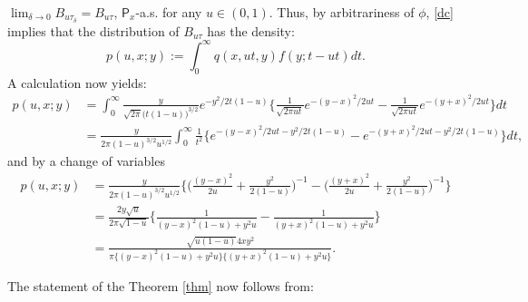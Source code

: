 \documentclass[reqno,10pt]{amsart}
\theoremstyle{definition}
\theoremstyle{remark}
\numberwithin{equation}{section}
\begin{document}
$\lim_{\delta\to 0}B_{u\tau_\delta}=B_{u\tau}$, ${\mathsf{P}}_x$-a.s. for any $u\in(0,1)$. Thus, by arbitrariness of $\phi$,
\eqref{dc}  implies that the distribution of $B_{u\tau}$ has the density:
$$
p(u,x;y):=\int_0^\infty q(x,u t,y) f(y;t-ut)dt.
$$
A calculation now yields:
\begin{align*}
p(u,x;y)&=
\int_0^\infty
\frac{y}{\sqrt{2\pi} \big(t(1-u)\big)^{3/2}}
e^{-y^2/2t(1-u)}
\bigg\{\frac{1}{\sqrt{2\pi ut}}e^{-(y-x)^2/2ut}-\frac{1}{\sqrt{2\pi ut}}e^{-(y+x)^2/2ut}\bigg\}dt
\\
&=\frac{y}{2\pi (1-u)^{3/2}u^{1/2}}
\int_0^\infty
\frac{1}{t^2}
\bigg\{e^{-(y-x)^2/2ut-y^2/2t(1-u)}-e^{-(y+x)^2/2ut-y^2/2t(1-u)}\bigg\}dt,
\end{align*}
and by a change of variables
\begin{align*}
p(u,x;y)&=
\frac{y}{2\pi (1-u)^{3/2}u^{1/2}}
\bigg\{
\Big(\frac{(y-x)^2}{2u}+\frac{y^2}{2(1-u)}\Big)^{-1}-
\Big(\frac{(y+x)^2}{2u}+\frac{y^2}{2(1-u)}\Big)^{-1}\bigg\}\\
&=\frac{2y\sqrt{u}}{2\pi \sqrt{1-u}}
\bigg\{\frac{1}{(y-x)^2(1-u)+y^2 u}-
\frac{1}{(y+x)^2(1-u)+y^2 u}
\bigg\}\\
&=\frac{
\sqrt{u(1-u)}4xy^2
}{\pi\Big\{(y-x)^2(1-u)+y^2 u\Big\}\Big\{(y+x)^2(1-u)+y^2 u\Big\}}.
\end{align*}

The statement of the Theorem \ref{thm} now follows from:
\end{document}
